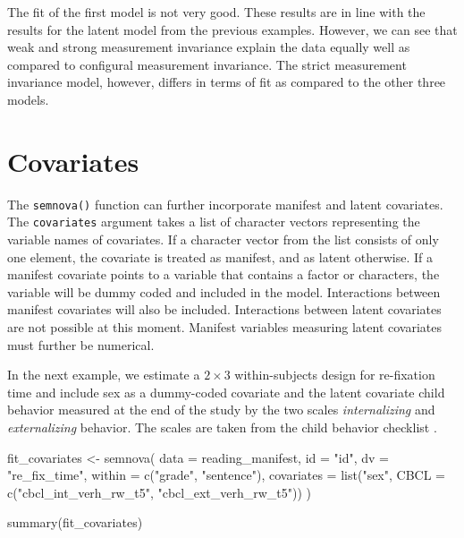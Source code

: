 \documentclass[
]{book}
\newenvironment{Shaded}{\begin{snugshade}}{\end{snugshade}}
\newcommand{\AttributeTok}[1]{\textcolor[rgb]{0.77,0.63,0.00}{#1}}
\newcommand{\FunctionTok}[1]{\textcolor[rgb]{0.00,0.00,0.00}{#1}}
\newcommand{\NormalTok}[1]{#1}
\newcommand{\OtherTok}[1]{\textcolor[rgb]{0.56,0.35,0.01}{#1}}
\newcommand{\StringTok}[1]{\textcolor[rgb]{0.31,0.60,0.02}{#1}}
\begin{document}
The fit of the first model is not very good. These results are in line with the results for the latent model from the previous examples. However, we can see that weak and strong measurement invariance explain the data equally well as compared to configural measurement invariance. The strict measurement invariance model, however, differs in terms of fit as compared to the other three models.

\hypertarget{covariates}{%
\chapter{Covariates}\label{covariates}}

The \texttt{semnova()} function can further incorporate manifest and latent covariates. The \texttt{covariates} argument takes a list of character vectors representing the variable names of covariates. If a character vector from the list consists of only one element, the covariate is treated as manifest, and as latent otherwise. If a manifest covariate points to a variable that contains a factor or characters, the variable will be dummy coded and included in the model. Interactions between manifest covariates will also be included. Interactions between latent covariates are not possible at this moment. Manifest variables measuring latent covariates must further be numerical.

In the next example, we estimate a \(2 \times 3\) within-subjects design for re-fixation time and include sex as a dummy-coded covariate and the latent covariate child behavior measured at the end of the study by the two scales \emph{internalizing} and \emph{externalizing} behavior. The scales are taken from the child behavior checklist \citep[CBLB,][]{Achenbach1991a}.

\begin{Shaded}
\begin{Highlighting}[]
\NormalTok{fit\_covariates }\OtherTok{\textless{}{-}} \FunctionTok{semnova}\NormalTok{(}
    \AttributeTok{data =}\NormalTok{ reading\_manifest,}
    \AttributeTok{id =} \StringTok{"id"}\NormalTok{, }
    \AttributeTok{dv =} \StringTok{"re\_fix\_time"}\NormalTok{,}
    \AttributeTok{within =} \FunctionTok{c}\NormalTok{(}\StringTok{"grade"}\NormalTok{, }\StringTok{"sentence"}\NormalTok{),}
    \AttributeTok{covariates =} \FunctionTok{list}\NormalTok{(}\StringTok{"sex"}\NormalTok{, }\AttributeTok{CBCL =} \FunctionTok{c}\NormalTok{(}\StringTok{"cbcl\_int\_verh\_rw\_t5"}\NormalTok{, }\StringTok{"cbcl\_ext\_verh\_rw\_t5"}\NormalTok{))}
\NormalTok{)}

\FunctionTok{summary}\NormalTok{(fit\_covariates)}
\end{Highlighting}
\end{Shaded}
\end{document}
